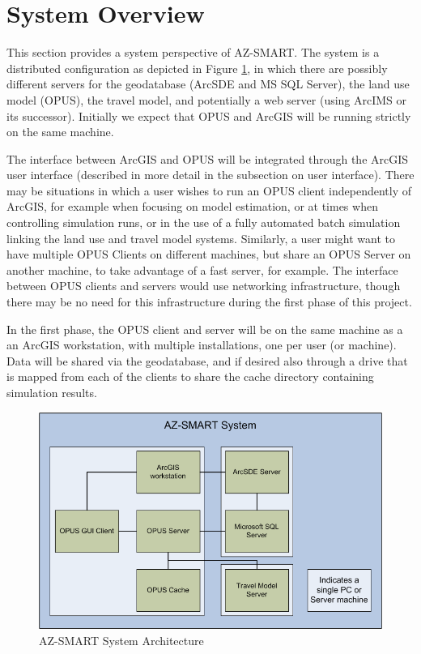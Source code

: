 \section{System Overview}
This section provides a system perspective of AZ-SMART.  The system
is a distributed configuration as depicted in Figure
\ref{figSystem}, in which there are possibly different servers for
the geodatabase (ArcSDE and MS SQL Server), the land use model
(OPUS), the travel model, and potentially a web server (using ArcIMS
or its successor).  Initially we expect that OPUS and ArcGIS will be
running strictly on the same machine.

The interface between ArcGIS and OPUS will be integrated through the ArcGIS user interface (described in more detail in the subsection on
user interface).  There may be situations in which a user wishes to run an OPUS client independently of ArcGIS, for example when focusing
on model estimation, or at times when controlling simulation runs, or in the use of a fully automated batch simulation linking the land
use and travel model systems.  Similarly, a user might want to have multiple OPUS Clients on different machines, but share an OPUS Server
on another machine, to take advantage of a fast server, for example.  The interface between OPUS clients and servers would use networking
infrastructure, though there may be no need for this infrastructure during the first phase of this project.

In the first phase, the OPUS client and server will be on the same
machine as a an ArcGIS workstation, with multiple installations, one
per user (or machine).  Data will be shared via the geodatabase, and
if desired also through a drive that is mapped from each of the
clients to share the cache directory containing simulation results.

\begin{figure}[h]
\begin{center}
\includegraphics[scale=0.5]{figures/AZ-SMART_system_diagram.png}
\caption{AZ-SMART System Architecture}
\label{figSystem}
\end{center}
\end{figure}

